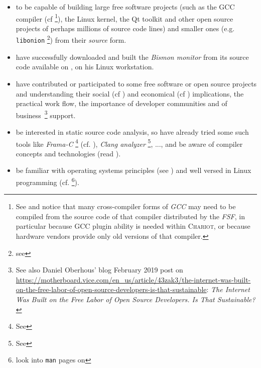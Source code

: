 \begin{itemize}
\item to be capable of building large free software projects (such as
  the GCC compiler (cf \cite{gcc-internals} \footnote{See
     and notice that many cross-compiler
    forms of \emph{GCC} may need to be compiled from the source code
    of that compiler distributed by the \emph{FSF}, in particular
    because GCC plugin ability is needed within \textsc{Chariot}, or
    because hardware vendors provide only old versions of that
    compiler.}), the Linux kernel, the Qt toolkit and other open
  source projects of perhaps millions of source code lines) and
  smaller ones (e.g. \texttt{libonion} \footnote{see
    }) from their \emph{source}
  form.

\item have successfully downloaded and built the \emph{Bismon monitor}
   from its source code available on
  , on his Linux
  workstation.
  
\item have contributed or participated to some free software or open
  source projects and understanding their social (cf
  \cite{Raymond:2001:CathBaz}) and economical (cf
  \cite{Weber:2004:SuccessOpenSource, Tirole:2016:EcoBienCommun,
    Nagle:2018:Contributing, DiCosmo:1998:Holdup,
    Lerner-Tirole:2000:economics-open-source}) implications, the
  practical work flow, the importance of developer communities and of
  business~\footnote{See also Daniel Oberhous' blog February 2019 post
    on
    \url{https://motherboard.vice.com/en_us/article/43zak3/the-internet-was-built-on-the-free-labor-of-open-source-developers-is-that-sustainable}:
    \emph{The Internet Was Built on the Free Labor of Open Source
      Developers. Is That Sustainable?}} support.
  
\item be interested in static source code analysis, so have already
  tried some such tools like \emph{Frama-C} \footnote{See
    } (cf. \cite{Cuoq:2012:Frama-C}),
  \emph{Clang analyzer} \footnote{See
    }, ..., and be aware of
   compiler concepts and technologies (read
  \cite{Aho:2006:DragonBook}).

\item be familiar with operating systems principles
  (see \cite{Tanenbaum:92:OS,ArpaciDusseau14-Book}) and well
  versed in Linux programming
  (cf. \cite{Mitchell:2001:ALP,Kerrisk:2010:LinuxProgramming} \footnote{look
    into \texttt{man} pages on
    }).


\end{itemize}
